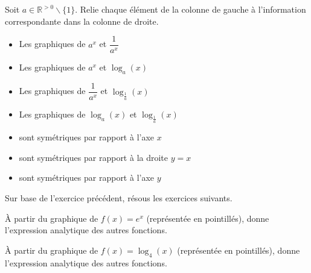 \documentclass[a4paper,12pt,singlepage]{report}
\newcommand{\IR}{\mathbb{R}}
\begin{document}
\begin{exercice}
Soit \(a\in\IR^{>0}\backslash\{1\}\). Relie chaque élément de la colonne de gauche
à l'information correspondante dans la colonne de droite.

\par \setlength{\columnseprule}{0 pt}
          \begin{minipage}[t]{\linewidth}
          \begin{multicols}{2}

\begin{itemize}
\item Les graphiques de \(a^x\) et \(\dfrac{1}{a^x}\)

\item Les graphiques de \(a^x\) et \(\log_a(x)\)

\item Les graphiques de \(\dfrac{1}{a^x}\) et \(\log_{\frac{1}{a}}(x)\)

\item Les graphiques de \(\log_a(x)\) et \(\log_{\frac{1}{a}}(x)\)
\end{itemize}

\columnbreak

\begin{itemize}
\item sont symétriques par rapport à l'axe \(x\)

\item sont symétriques par rapport à la droite \(y=x\)

\item sont symétriques par rapport à l'axe \(y\)
\end{itemize}



\end{multicols}\end{minipage}
\end{exercice}

Sur base de l'exercice précédent, résous les exercices suivants.

\begin{exercice}
À partir du graphique de \(f(x)=e^x\) (représentée en pointillés), donne
l'expression analytique des autres fonctions.

\begin{center}

\end{center}
\end{exercice}

\begin{exercice}
À partir du graphique de \(f(x)=\log_4(x)\) (représentée en pointillés), donne l'expression analytique des autres fonctions.
\begin{center}

\end{center}
\end{exercice}
\end{document}
